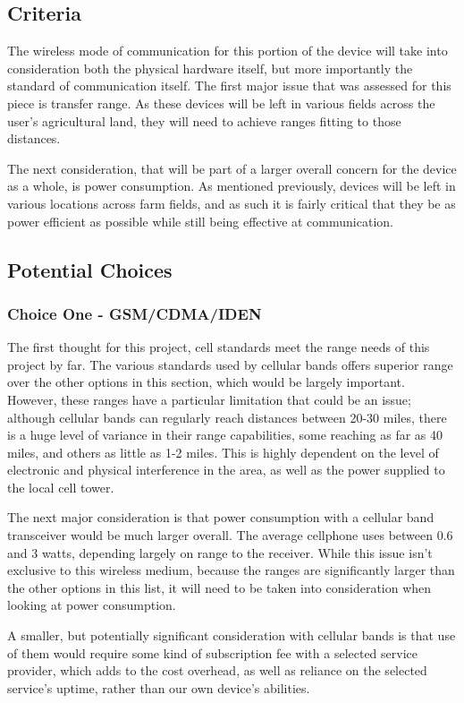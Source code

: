 \documentclass[onecolumn, draftclsnofoot,10pt, compsoc]{IEEEtran}
\begin{document}
    \subsection{Criteria}
    The wireless mode of communication for this portion of the device will take into consideration both the physical hardware itself, but more importantly the standard of communication itself.
    The first major issue that was assessed for this piece is transfer range.
    As these devices will be left in various fields across the user's agricultural land, they will need to achieve ranges fitting to those distances.\par
    The next consideration, that will be part of a larger overall concern for the device as a whole, is power consumption.
    As mentioned previously, devices will be left in various locations across farm fields, and as such it is fairly critical that they be as power efficient as possible while still being effective at communication.\par
    
    \subsection{Potential Choices}
    \subsubsection{Choice One - GSM/CDMA/IDEN}
    The first thought for this project, cell standards meet the range needs of this project by far.
    The various standards used by cellular bands offers superior range over the other options in this section, which would be largely important.
    However, these ranges have a particular limitation that could be an issue; although cellular bands can regularly reach distances between 20-30 miles, there is a huge level of variance in their range capabilities, some reaching as far as 40 miles, and others as little as 1-2 miles.
    This is highly dependent on the level of electronic and physical interference in the area, as well as the power supplied to the local cell tower.\cite{cell_wiki}\cite{hsw_cell}\par
    The next major consideration is that power consumption with a cellular band transceiver would be much larger overall.
    The average cellphone uses between 0.6 and 3 watts, depending largely on range to the receiver.\cite{hsw_cell}
    While this issue isn't exclusive to this wireless medium, because the ranges are significantly larger than the other options in this list, it will need to be taken into consideration when looking at power consumption.\par
    A smaller, but potentially significant consideration with cellular bands is that use of them would require some kind of subscription fee with a selected service provider, which adds to the cost overhead, as well as reliance on the selected service's uptime, rather than our own device's abilities.
    
\end{document}
